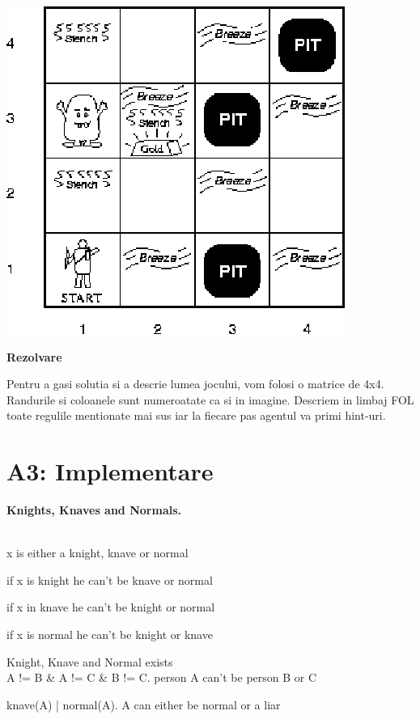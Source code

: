 \documentclass[a4paper,12pt]{report}
\begin{document}
\includegraphics{wumpus.png}\\
\begin{Large}
 \textbf{Rezolvare}\\
\end{Large}
Pentru a gasi solutia si a descrie lumea jocului, vom folosi o matrice de 4x4. Randurile si coloanele sunt numeroatate ca si in imagine. Descriem in limbaj FOL toate regulile mentionate mai sus iar la fiecare pas agentul va primi hint-uri.

\chapter{A3: Implementare}

%
\begin{Large}
 \textbf{Knights, Knaves and Normals.}\\
\end{Large}\\

x is either a knight, knave or normal

if x is knight he can't be knave or normal

if x in knave he can't be knight or normal

if x is normal he can't be knight or knave


Knight, Knave and Normal exists\\


A != B & A != C & B != C. person A can't be person B or C

knave(A) | normal(A). A can either be normal or a liar
\end{document}
